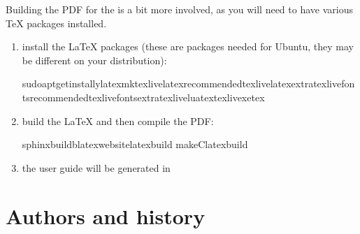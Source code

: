 \documentclass[letterpaper,10pt,english,openany,oneside]{sphinxmanual}
\begin{document}
\sphinxAtStartPar
Building the PDF for the  is a bit more involved, as
you will need to have various TeX packages installed.
\begin{enumerate}
%
\item {} 
\sphinxAtStartPar
install the LaTeX packages (these are packages needed for Ubuntu,
they may be different on your distribution):

\begin{sphinxVerbatim}[commandchars=\\\{\}]
sudoapt\PYGZhy{}getinstall\PYGZhy{}ylatexmktexlive\PYGZhy{}latex\PYGZhy{}recommendedtexlive\PYGZhy{}latex\PYGZhy{}extratexlive\PYGZhy{}fonts\PYGZhy{}recommendedtexlive\PYGZhy{}fonts\PYGZhy{}extratexlive\PYGZhy{}luatextexlive\PYGZhy{}xetex
\end{sphinxVerbatim}

\item {} 
\sphinxAtStartPar
build the LaTeX and then compile the PDF:

\begin{sphinxVerbatim}[commandchars=\\\{\}]
sphinx\PYGZhy{}build\PYGZhy{}blatexwebsite\PYGZus{}latexbuild
make\PYGZhy{}C\PYGZus{}latexbuild
\end{sphinxVerbatim}

\item {} 
\sphinxAtStartPar
the user guide will be generated in 

\end{enumerate}

\sphinxstepscope


\chapter{Authors and history}
\label{\detokenize{docs/guide-chapter-changes:authors-and-history}}\label{\detokenize{docs/guide-chapter-changes:guide-changes-authors}}\label{\detokenize{docs/guide-chapter-changes::doc}}
\end{document}
